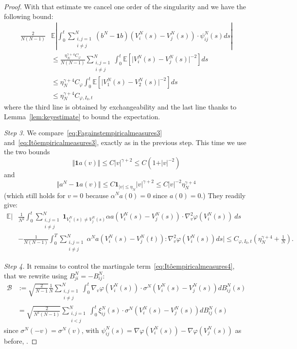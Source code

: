 \documentclass[11pt,a4paper]{article}
\theoremstyle{definition}
\theoremstyle{plain}
\begin{document}
\begin{proof}
    With that estimate we cancel one order of the singularity and we have the following bound:
    \begin{align*}
        \frac{2}{N(N-1)} &\mathbb{E}\left\vert \int_0^t \sum_{\substack{i,j=1\\ i\neq j}}^N  (b^N-\mathbf{1}b)\left(V^N_i(s) -V^N_j(s)\right)  \cdot \psi^N_{ij}(s) ds\right\vert \\
        &\leq \frac{\eta_N^{\gamma+4}C_\varphi}{N(N-1)} \sum_{\substack{i,j=1\\ i\neq j}}^N\int_0^t \mathbb{E} \left[\vert V^N_i(s) -V^N_j(s)\vert^{-2}\right]   ds\\
        &\leq \eta_N^{\gamma+4}C_\varphi \int_0^t \mathbb{E} \left[\vert V^N_1(s) -V^N_2(s)\vert^{-2}\right]   ds\\
        &\leq  \eta_N^{\gamma+4} C_{\varphi,I_0,t}
    \end{align*}
    where the third line is obtained by exchangeability and the last line thanks to Lemma~\ref{lem:keyestimate} to bound the expectation.

    \textit{Step 3.}
    We compare~\eqref{eq:Fagainstempiricalmeasures3} and~\eqref{eq:Itôempiricalmeasures3}, exactly as in the previous step.
    This time we use the two bounds
    $$\Vert\mathbf{1}a(v)\Vert \leq C \vert v \vert^{\gamma+2} \leq C(1 + \vert v \vert^{-2})$$ 
    and
    $$\Vert a^N - \mathbf{1}a(v)\Vert \leq C \mathbf{1}_{\vert v \vert \leq \eta_N}\vert v \vert^{\gamma + 2}  \leq C \vert v \vert^{-2} \eta_N^{\gamma+4}$$
    (which still holds for $v=0$ because $\alpha^N a(0)=0$ since $a(0)=0$.)
    They readily give:
    \begin{align*}
    \mathbb{E}\Bigg\vert &\frac{1}{N^2} \int_0^t \sum_{\substack{i,j=1\\ i\neq j}}^N \mathbf{1}_{V^N_i(s)\neq V^N_j(s)}\alpha a(V^N_i(s)-V^N_j(s)) \cdot \nabla^2_v\varphi(V^N_i(s))\ ds\\
    &- \frac{1}{N(N-1)} \int_0^T \sum_{\substack{i,j=1\\ i\neq j}}^N  \alpha^Na\left(V^N_i(s) -V^N_j(t)\right):\nabla^2_v\varphi\left(V^N_i(s)\right)ds \Bigg\vert\leq C_{\varphi,I_0,t}\left(\eta_N^{\gamma+4}+\frac{1}{N}\right) .
    \end{align*}

    \textit{Step 4.} It remains to control the martingale term~\eqref{eq:Itôempiricalmeasures4}, that we rewrite using $B^N_{ji}=-B^N_{ij}$:
    \begin{align*}
        \mathcal{B} &:= \sqrt{\frac{2}{N-1}}\frac{1}{N}\sum_{\substack{i,j=1\\ i\neq j}}^N \int_0^t  \nabla_v \varphi\left(V^N_i(s)\right)\cdot \sigma^N \left(V^N_i(s) - V^N_j(s)\right)dB^N_{ij}(s)\\
    &= \sqrt{\frac{2}{N^2(N-1)}}\sum_{\substack{i,j=1\\ i< j}}^N \int_0^t  \xi^N_{ij}(s)\cdot \sigma^N \left(V^N_i(s) - V^N_j(s)\right)dB^N_{ij}(s)
    \end{align*}
    since $\sigma^N(-v)=\sigma^N(v)$, with $\psi^N_{ij}(s) = \nabla\varphi(V^N_i(s))-\nabla \varphi(V^N_j(s))$ as before, .
    

\end{proof}
\end{document}
